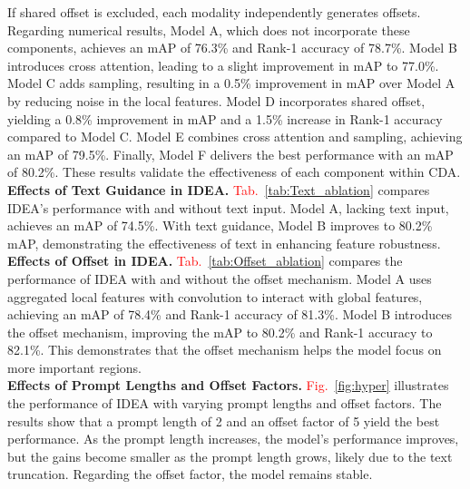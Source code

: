 %
If shared offset is excluded, each modality independently generates offsets.
%
Regarding numerical results, Model A, which does not incorporate these components, achieves an mAP of 76.3\% and Rank-1 accuracy of 78.7\%.
%
Model B introduces cross attention, leading to a slight improvement in mAP to 77.0\%.
%
Model C adds sampling, resulting in a 0.5\% improvement in mAP over Model A by reducing noise in the local features.
%
Model D incorporates shared offset, yielding a 0.8\% improvement in mAP and a 1.5\% increase in Rank-1 accuracy compared to Model C.
%
Model E combines cross attention and sampling, achieving an mAP of 79.5\%.
%
Finally, Model F delivers the best performance with an mAP of 80.2\%.
%
These results validate the effectiveness of each component within CDA.
\\
\textbf{Effects of Text Guidance in IDEA.}
\textcolor{red}{Tab.}~\ref{tab:Text_ablation} compares IDEA's performance with and without text input.
%
Model A, lacking text input, achieves an mAP of 74.5\%. 
%
With text guidance, Model B improves to 80.2\% mAP, demonstrating the effectiveness of text in enhancing feature robustness.
%
\\
\textbf{Effects of Offset in IDEA.}
\textcolor{red}{Tab.}~\ref{tab:Offset_ablation} compares the performance of IDEA with and without the offset mechanism.
%
Model A uses aggregated local features with convolution to interact with global features, achieving an mAP of 78.4\% and Rank-1 accuracy of 81.3\%.
%
Model B introduces the offset mechanism, improving the mAP to 80.2\% and Rank-1 accuracy to 82.1\%. 
%
This demonstrates that the offset mechanism helps the model focus on more important regions.
\\
\textbf{Effects of Prompt Lengths and Offset Factors.}
\textcolor{red}{Fig.}~\ref{fig:hyper} illustrates the performance of IDEA with varying prompt lengths and offset factors. 
%
The results show that a prompt length of 2 and an offset factor of 5 yield the best performance.
%
As the prompt length increases, the model's performance improves, but the gains become smaller as the prompt length grows, likely due to the text truncation.
%
Regarding the offset factor, the model remains stable.
